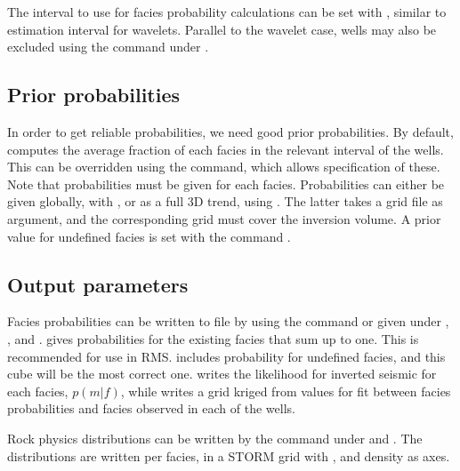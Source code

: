 
The interval to use for facies probability calculations can be
set with , similar to
estimation interval for wavelets. Parallel to the wavelet case, wells
may also be excluded using the 
command under .

\subsection{Prior probabilities}
In order to get reliable probabilities, we need good prior
probabilities. By default, \crava computes the average fraction of
each facies in the relevant interval of the wells. This can be
overridden using the  command, which
allows specification of these. Note that probabilities must be given
for each facies. Probabilities can either be given globally, with
, or as a full 3D trend, using
. The latter takes a grid file as argument,
and the corresponding grid must cover the inversion volume.
A prior value for
undefined facies is set with the command . 

\subsection{Output parameters}
Facies probabilities can be written to file by using the command
 or
given under , ,  
 and .  gives probabilities for
the existing facies that sum up to one. This is recommended for use in
RMS.  includes probability for
undefined facies, and this cube will be the most correct
one.  writes the
likelihood for inverted seismic for each facies, $p(m|f)$, while
 writes a grid
kriged from values for fit between facies probabilities and facies
observed in each of the wells. 

Rock physics distributions can be written by the command
under  and . The distributions are
written per facies, in a STORM grid with \vp, \vs and density as
axes. 


